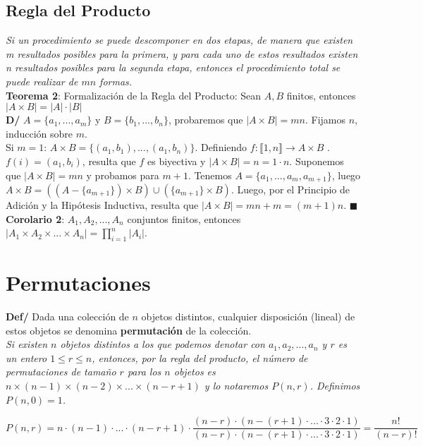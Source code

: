 \documentclass[11pt,a4paper]{article}
\newcommand*{\QEDA}{\null\nobreak\hfill\ensuremath{\blacksquare}}
\begin{document}
\subsection{Regla del Producto}
\noindent \textit{Si un procedimiento se puede descomponer en dos etapas, de manera que existen m resultados posibles para la primera, y para cada uno de estos resultados existen n resultados posibles para la segunda etapa, entonces el procedimiento total se puede realizar de $mn$ formas.}\\

\noindent \textbf{Teorema 2}: Formalizaci\'on de la Regla del Producto: Sean $A,B$ finitos, entonces $|A \times B| = |A|\cdot|B|$\\
\textbf{D/} $A=\{a_1,...,a_m\}$ y $B=\{b_1,...,b_n\}$, probaremos que $|A \times B| = mn$. Fijamos $n$, inducci\'on sobre $m$. \\
Si $m=1$: $A \times B = \{(a_1,b_1),...,(a_1, b_n)\}$. Definiendo $f : \llbracket 1, n \rrbracket \rightarrow A \times B$ . $f(i) = (a_1, b_i)$, resulta que $f$ es biyectiva y $|A \times B| = n = 1 \cdot n$. Suponemos que $|A \times B| = mn$ y probamos para $m+1$. Tenemos $A = \{a_1, ..., a_m, a_{m+1}\}$, luego $A \times B = ((A - \{a_{m+1}\}) \times B) \cup (\{a_{m+1}\} \times B)$. Luego, por el Principio de Adici\'on y la Hip\'otesis Inductiva, resulta que $|A \times B| = mn + m = (m+1)n$. \QEDA\\

\noindent \textbf{Corolario 2}: $A_1, A_2, ..., A_n$ conjuntos finitos, entonces $|A_1 \times A_2 \times ... \times A_n| = \prod_{i=1}^n |A_i|$.\\

\section{Permutaciones}
\noindent \textbf{Def/} Dada una colección de $n$ objetos distintos, cualquier disposición (lineal) de estos objetos se denomina \textbf{permutación} de la colección.\\

\noindent \textit{Si existen $n$ objetos distintos a los que podemos denotar con $a_1, a_2, ..., a_n$ y $r$ es un entero $1 \leq r \leq n$, entonces, por la regla del producto, el número de permutaciones de tamaño $r$ para los $n$ objetos es $n \times (n-1) \times (n-2) \times ... \times (n-r+1)$ y lo notaremos $P(n,r)$. Definimos $P(n,0)=1$.}

$$P(n,r) = n\cdot (n-1)\cdot...\cdot(n-r+1) \cdot \dfrac{(n-r)\cdot(n-(r+1)\cdot...\cdot3\cdot2\cdot1)}{(n-r)\cdot(n-(r+1)\cdot...\cdot3\cdot2\cdot1)} = \dfrac{n!}{(n-r)!}$$
\end{document}
